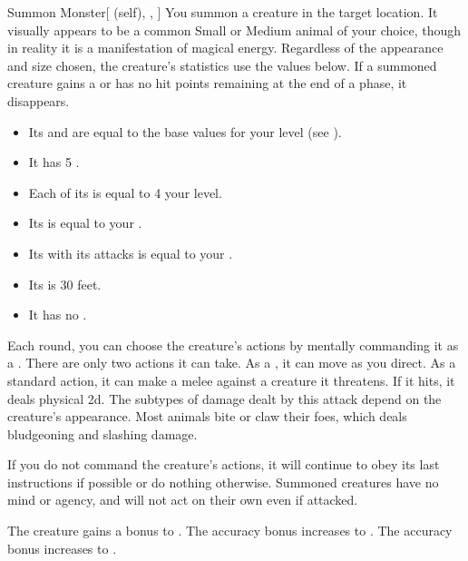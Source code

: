 \lowercase{\hypertarget{spell:Summon Monster}{}}\label{spell:Summon Monster}
\begin{attuneability}[Rank 1]{\hypertarget{spell:Summon Monster}{Summon Monster}}[ (self), , ]
You summon a creature in the target location.
It visually appears to be a common Small or Medium animal of your choice, though in reality it is a manifestation of magical energy.
Regardless of the appearance and size chosen, the creature's statistics use the values below.
If a summoned creature gains a  or has no hit points remaining at the end of a phase, it disappears.

\begin{itemize}
\item Its  and  are equal to the base values for your level (see ).
\item It has 5 .
\item Each of its  is equal to 4 \add your level.
\item Its  is equal to your  .
\item Its  with its attacks is equal to your .
\item Its  is 30 feet.
\item It has no .
\end{itemize}

Each round, you can choose the creature's actions by mentally commanding it as a .
There are only two actions it can take.
As a , it can move as you direct.
As a standard action, it can make a melee  against a creature it threatens.
If it hits, it deals physical  \minus2d.
The subtypes of damage dealt by this attack depend on the creature's appearance.
Most animals bite or claw their foes, which deals bludgeoning and slashing damage.

If you do not command the creature's actions, it will continue to obey its last instructions if possible or do nothing otherwise.
Summoned creatures have no mind or agency, and will not act on their own even if attacked.

\rankline
{} The creature gains a  bonus to .
 The accuracy bonus increases to .
 The accuracy bonus increases to .

\end{attuneability}
\vspace{0.25em}




